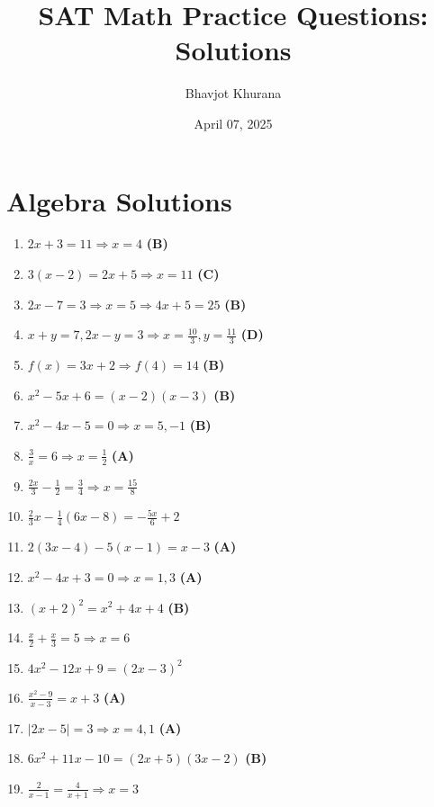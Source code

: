 \documentclass[12pt]{article}
\begin{document}
\title{SAT Math Practice Questions: Solutions}
\author{Bhavjot Khurana}
\date{April 07, 2025}
\maketitle
\tableofcontents
\newpage

\section{Algebra Solutions}
\begin{enumerate}[label=\textbf{Question \arabic*:}]
  \item \( 2x + 3 = 11 \Rightarrow x = 4 \) \textbf{(B)}
  \item \( 3(x - 2) = 2x + 5 \Rightarrow x = 11 \) \textbf{(C)}
  \item \( 2x - 7 = 3 \Rightarrow x = 5 \Rightarrow 4x + 5 = 25 \) \textbf{(B)}
  \item \( x + y = 7, 2x - y = 3 \Rightarrow x = \frac{10}{3}, y = \frac{11}{3} \) \textbf{(D)}
  \item \( f(x) = 3x + 2 \Rightarrow f(4) = 14 \) \textbf{(B)}
  \item \( x^2 - 5x + 6 = (x - 2)(x - 3) \) \textbf{(B)}
  \item \( x^2 - 4x - 5 = 0 \Rightarrow x = 5, -1 \) \textbf{(B)}
  \item \( \frac{3}{x} = 6 \Rightarrow x = \frac{1}{2} \) \textbf{(A)}
  \item \( \frac{2x}{3} - \frac{1}{2} = \frac{3}{4} \Rightarrow x = \frac{15}{8} \)
  \item \( \frac{2}{3}x - \frac{1}{4}(6x - 8) = -\frac{5x}{6} + 2 \)
  \item \( 2(3x - 4) - 5(x - 1) = x - 3 \) \textbf{(A)}
  \item \( x^2 - 4x + 3 = 0 \Rightarrow x = 1, 3 \) \textbf{(A)}
  \item \( (x + 2)^2 = x^2 + 4x + 4 \) \textbf{(B)}
  \item \( \frac{x}{2} + \frac{x}{3} = 5 \Rightarrow x = 6 \)
  \item \( 4x^2 - 12x + 9 = (2x - 3)^2 \)
  \item \( \frac{x^2 - 9}{x - 3} = x + 3 \) \textbf{(A)}
  \item \( |2x - 5| = 3 \Rightarrow x = 4, 1 \) \textbf{(A)}
  \item \( 6x^2 + 11x - 10 = (2x + 5)(3x - 2) \) \textbf{(B)}
  \item \( \frac{2}{x - 1} = \frac{4}{x + 1} \Rightarrow x = 3 \)

\end{enumerate}
\end{document}
